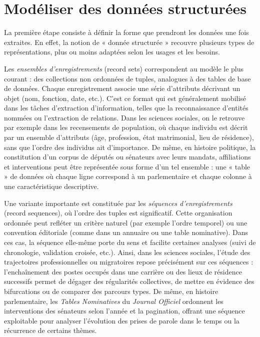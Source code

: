 \section{Modéliser des données structurées}

La première étape consiste à définir la forme que prendront les données une fois extraites. En effet, la notion de « donnée structurée » recouvre plusieurs types de représentations, plus ou moins adaptées selon les usages et les besoins.

Les \emph{ensembles d’enregistrements} (record sets) correspondent au modèle le plus courant : des collections non ordonnées de tuples, analogues à des tables de base de données. Chaque enregistrement associe une série d’attributs décrivant un objet (nom, fonction, date, etc.). C’est ce format qui est généralement mobilisé dans les tâches d’extraction d’information, telles que la reconnaissance d’entités nommées ou l’extraction de relations. Dans les sciences sociales, on le retrouve par exemple dans les recensements de population, où chaque individu est décrit par un ensemble d’attributs (âge, profession, état matrimonial, lieu de résidence), sans que l’ordre des individus ait d’importance. De même, en histoire politique, la constitution d’un corpus de députés ou sénateurs avec leurs mandats, affiliations et interventions peut être représentée sous forme d’un tel ensemble : une « table » de données où chaque ligne correspond à un parlementaire et chaque colonne à une caractéristique descriptive.

Une variante importante est constituée par les \emph{séquences d’enregistrements} (record sequences), où l’ordre des tuples est significatif. Cette organisation ordonnée peut refléter un critère naturel (par exemple l’ordre temporel) ou une convention éditoriale (comme dans un annuaire ou une table nominative). Dans ces cas, la séquence elle-même porte du sens et facilite certaines analyses (suivi de chronologie, validation croisée, etc.). Ainsi, dans les sciences sociales, l’étude des trajectoires professionnelles ou migratoires repose précisément sur ces séquences : l’enchaînement des postes occupés dans une carrière ou des lieux de résidence successifs permet de dégager des régularités collectives, de mettre en évidence des bifurcations ou de comparer des parcours types. De même, en histoire parlementaire, les \emph{Tables Nominatives} du \emph{Journal Officiel} ordonnent les interventions des sénateurs selon l’année et la pagination, offrant une séquence exploitable pour analyser l’évolution des prises de parole dans le temps ou la récurrence de certains thèmes.


